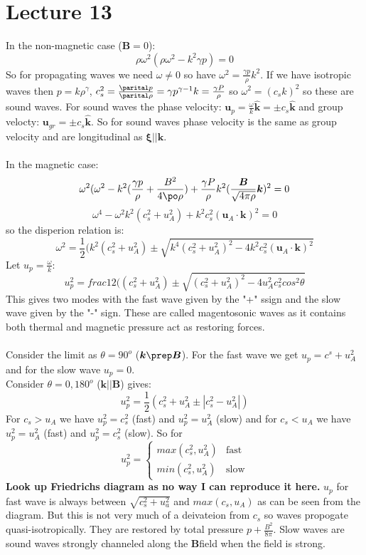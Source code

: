\documentclass{article}
\begin{document}
\section{Lecture 13}
In the non-magnetic case  ($\bm B = 0$):
$$
\rho \omega^2(\rho \omega^2 - k^2 \gamma p) = 0
$$
So for propagating waves we need $\omega \neq 0$ so have $\omega^2 = \frac{\gamma p}{\rho} k^2$. If we have isotropic waves then $p = k \rho^{\gamma}$, $c_s^2 = \frac{\parital p}{\parital \rho} = \gamma p^{\gamma -1} k = \frac{\gamma P}{\rho}$ so $\omega^2 = (c_sk)^2$ so these are sound waves. For sound waves the phase velocity: $\bm u_p = \frac{\omega}{k} \hat{\bm k} =  \pm c_s \hat{\bm k}$ and group velocty: $\bm u_{gr} = \pm c_s \hat{\bm k}$. So for sound waves phase velocity is the same as group velocity and are longitudinal as $\bm \xi || \bm k$.\\\\
In the magnetic case:
$$
\omega^2(\omega^2 - k^2(\frac{\gamma p}{\rho} + \frac{B^2}{4\po \rho}) + \frac{\gamma P}{\rho}k^2( \frac{\bm B}{\sqrt{4\pi \rho}} \bm k)^2 = 0
$$
$$
\omega^4 - \omega^2 k^2 (c_s^2 + u_A^2) + k^2 c_s^2(\bm u_A \cdot \bm k)^2 = 0
$$
so the disperion relation is:
$$
\omega^2 = \frac{1}{2}(k^2(c_s^2 + u_A^2)\pm \sqrt{k^4(c_s^2 + u_A^2)^2 - 4k^2 c_s^2 (\bm u_A \cdot \bm k)^2}
$$
Let $u_p = \frac{\omega}{k}$:
$$
u_p^2 = frac{1}{2}((c_s^2 + u_A^2)\pm \sqrt{(c_s^2 + u_A^2)^2 - 4u_A^2c_s^2 cos^2\theta}
$$
This gives two modes with the fast wave given by the "+" ssign and the slow wave given by the "-" sign. These are called magentosonic waves as it contains both thermal and magnetic pressure act as restoring forces.\\\\
Consider the limit as $\theta = 90^o$ ($\bm k \prep \bm B$). For the fast wave we get $u_p = c^s + u_A^2$ and for the slow wave $u_p = 0$.\\
Consider $\theta = 0, 180^o$ ($\bm k || \bm B$) gives:
$$
u_p^2 = \frac{1}{2} (c_s^2 + u_A^2 \pm|c_s^2 - u_A^2|)
$$
For $c_s > u_A$ we have $u_p^2 = c_s^2$ (fast) and $u_p^2 = u_A^2$ (slow) and for  $c_s < u_A$ we have $u_p^2 = u_A^2$ (fast) and $u_p^2 = c_s^2$ (slow). So for
$$
u_p^2 = \begin{cases} max(c_s^2, u_A^2) & \text{fast} \\
min(c_s^2, u_A^2) & \text{slow}\end{cases}
$$
\textbf{Look up Friedrichs diagram as no way I can reproduce it here.} 
$u_p$ for fast wave is always between $\sqrt{c_s^2 + u_a^2} $ and $max(c_s, u_A)$ as can be seen from the diagram. But this is not very much of a deivateion from $c_s$ so waves propogate quasi-isotropically. They are restored by total pressure $p+\frac{B^2}{8 \pi}$. Slow waves are sound waves strongly channeled along the $\bm B$field when the field is strong. 
\end{document}
